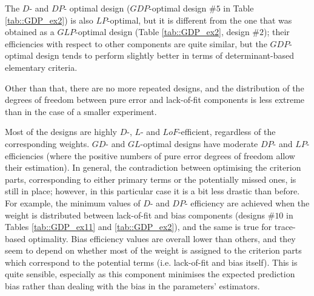 The $D$- and $DP$- optimal design ($GDP$-optimal design \#$5$ in Table \ref{tab::GDP_ex2}) is also $LP$-optimal, but it is different from the one that was obtained as a $GLP$-optimal design (Table \ref{tab::GDP_ex2}, design \#$2$); their efficiencies with respect to other components are quite similar, but the $GDP$-optimal design tends to perform slightly better in terms of determinant-based elementary criteria.

Other than that, there are no more repeated designs, and the distribution of the degrees of freedom between pure error and lack-of-fit components is less extreme than in the case of a smaller experiment.

Most of the designs are highly $D$-, $L$- and $LoF$-efficient, regardless of the corresponding weights. $GD$- and $GL$-optimal designs have moderate $DP$- and $LP$-efficiencies (where the positive numbers of pure error degrees of freedom allow their estimation). In general, the contradiction between optimising the criterion parts, corresponding to either primary terms or the potentially missed ones, is still in place; however, in this particular case it is a bit less drastic than before. For example, the minimum values of $D$- and $DP$- efficiency are achieved when the weight is distributed between lack-of-fit and bias components (designs \#$10$ in Tables \ref{tab::GDP_ex11} and \ref{tab::GDP_ex2}), and the same is true for trace-based optimality.  Bias efficiency values are overall lower than others, and they seem to depend on whether most of the weight is assigned to the criterion parts which correspond to the potential terms (i.e. lack-of-fit and bias itself). This is quite sensible, especially as this component minimises the expected prediction bias rather than dealing with the bias in the parameters' estimators. 

